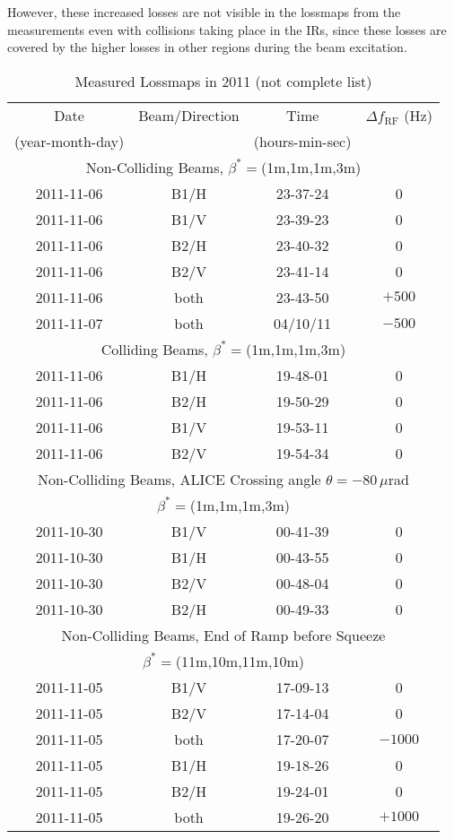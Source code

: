 However, these increased losses are not visible in the lossmaps from the measurements even with collisions taking place in the IRs, since these losses are covered by the higher losses in other regions during the beam excitation.

\begin{table}[htbp]
\caption{Measured Lossmaps in 2011 (not complete list)}
\begin{center}
\begin{tabular}{cccc}
\toprule
Date & Beam/Direction & Time & $\Delta f_{\text{RF}}$ (Hz) \\ %
(year-month-day) &  & (hours-min-sec) &  \\ \toprule %
\multicolumn{4}{c}{Non-Colliding Beams, $\beta^*=$(1m,1m,1m,3m)}  \\ \midrule
2011-11-06 & B1/H & 23-37-24 & 0 \\ %
2011-11-06 & B1/V & 23-39-23 & 0 \\ %
2011-11-06 & B2/H & 23-40-32 & 0 \\ %
2011-11-06 & B2/V & 23-41-14 & 0 \\ %
2011-11-06 & both & 23-43-50 & $+500$ \\ %
2011-11-07 & both & 04/10/11 & $-500$ \\ \midrule
\multicolumn{4}{c}{Colliding Beams, $\beta^*=$(1m,1m,1m,3m)}  \\ \midrule
2011-11-06 & B1/H & 19-48-01 & 0 \\ %
2011-11-06 & B2/H & 19-50-29 & 0 \\ 
2011-11-06 & B1/V & 19-53-11 & 0 \\
2011-11-06 & B2/V & 19-54-34 & 0 \\ \midrule
\multicolumn{4}{c}{Non-Colliding Beams, ALICE Crossing angle $\theta = -80 \, \mu$rad}  \\ %
\multicolumn{4}{c}{$\beta^*=$(1m,1m,1m,3m)}  \\ \midrule
2011-10-30 & B1/V & 00-41-39 & 0 \\ %
2011-10-30 & B1/H & 00-43-55 & 0 \\
2011-10-30 & B2/V & 00-48-04 & 0 \\ 
2011-10-30 & B2/H & 00-49-33 & 0 \\ \midrule
\multicolumn{4}{c}{Non-Colliding Beams, End of Ramp before Squeeze}  \\ %
\multicolumn{4}{c}{$\beta^*=$(11m,10m,11m,10m)}  \\ \midrule
2011-11-05 & B1/V & 17-09-13 & 0  \\ %
2011-11-05 & B2/V & 17-14-04 & 0 \\ %
2011-11-05 & both & 17-20-07 & $-1000$ \\ %
2011-11-05 & B1/H & 19-18-26 & 0 \\ %
2011-11-05 & B2/H & 19-24-01 & 0 \\ %
2011-11-05 & both & 19-26-20 & $+1000$ \\ \bottomrule
\end{tabular}
\end{center}
\label{tab:14051601}
\end{table}
